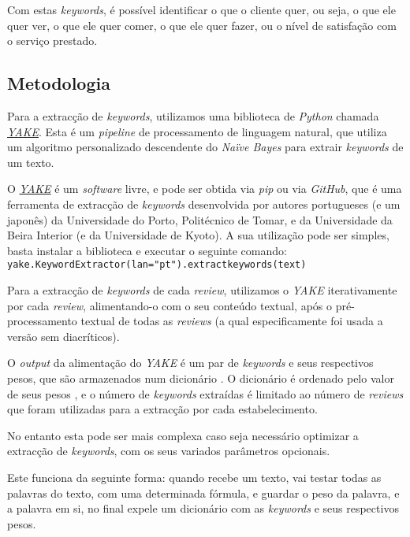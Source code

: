 Com estas \textit{keywords}, é possível identificar o que o cliente quer, ou seja, o que ele quer ver, o que ele quer comer, o que ele quer fazer, ou o nível de satisfação com o serviço prestado.

\subsection{Metodologia}

Para a extracção de \textit{keywords}, utilizamos uma biblioteca de \textit{Python} chamada \href{http://yake.inesctec.pt/}{\textit{YAKE}}. Esta é um \textit{pipeline} de processamento de linguagem natural, que utiliza um algoritmo personalizado descendente do \textit{Naïve Bayes} para extrair \textit{keywords} de um texto. 

O \href{http://yake.inesctec.pt/}{\textit{YAKE}} é um \textit{software} livre, e pode ser obtida via \textit{pip} ou via \textit{GitHub}, que é uma ferramenta de extracção de \textit{keywords} desenvolvida por autores portugueses (e um japonês) da Universidade do Porto, Politécnico de Tomar, e da Universidade da Beira Interior (e da Universidade de Kyoto).
A sua utilização pode ser simples, basta instalar a biblioteca e executar o seguinte comando: \texttt{yake.KeywordExtractor(lan="pt").extract\textunderscore keywords(text)}

Para a extracção de \textit{keywords} de cada \textit{review}, utilizamos o \textit{YAKE} iterativamente por cada \textit{review}, alimentando-o com o seu conteúdo textual, após o pré-processamento textual de todas as \textit{reviews} (a qual especificamente foi usada a versão sem diacríticos).

O \textit{output} da alimentação do \textit{YAKE} é um par de \textit{keywords} e seus respectivos pesos, que são armazenados num dicionário \cite{tamgh1}. O dicionário é ordenado pelo valor de seus pesos \cite{tamyt3}, e o número de \textit{keywords} extraídas é limitado ao número de \textit{reviews} que foram utilizadas para a extracção por cada estabelecimento.

No entanto esta pode ser mais complexa caso seja necessário optimizar a extracção de \textit{keywords}, com os seus variados parâmetros opcionais.

Este funciona da seguinte forma: quando recebe um texto, vai testar todas as palavras do texto, com uma determinada fórmula, e guardar o peso da palavra, e a palavra em si, no final expele um dicionário com as \textit{keywords} e seus respectivos pesos.


